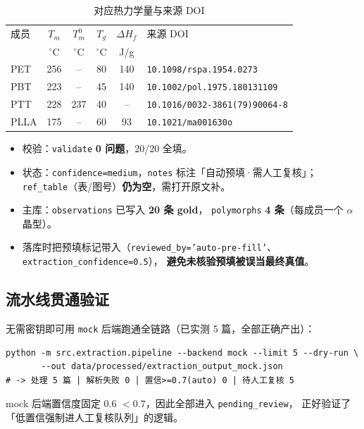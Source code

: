 \documentclass[11pt,a4paper]{ctexart}
\begin{document}
\begin{table}[htbp]
\centering
\caption{对应热力学量与来源 DOI}
\begin{tabular}{l c c c c l}
\toprule
成员 & $T_m$ & $T_m^0$ & $T_g$ & $\Delta H_f$ & 来源 DOI \\
     & $^\circ$C & $^\circ$C & $^\circ$C & J/g & \\
\midrule
PET  & 256 & --  & 80 & 140 & \texttt{10.1098/rspa.1954.0273} \\
PBT  & 223 & --  & 45 & 140 & \texttt{10.1002/pol.1975.180131109} \\
PTT  & 228 & 237 & 40 & --  & \texttt{10.1016/0032-3861(79)90064-8} \\
PLLA & 175 & --  & 60 & 93  & \texttt{10.1021/ma001630o} \\
\bottomrule
\end{tabular}
\end{table}

\begin{itemize}[leftmargin=1.2em]
  \item 校验：\texttt{validate} \textbf{0 问题}，20/20 全填。
  \item 状态：\texttt{confidence=medium}，\texttt{notes} 标注「自动预填·需人工复核」；
        \texttt{ref\_table}（表/图号）\textbf{仍为空}，需打开原文补。
  \item 主库：\texttt{observations} 已写入 \textbf{20 条 gold}，
        \texttt{polymorphs} \textbf{4 条}（每成员一个 $\alpha$ 晶型）。
  \item 落库时把预填标记带入（\texttt{reviewed\_by='auto-pre-fill'}、
        \texttt{extraction\_confidence=0.5}），
        \textbf{避免未核验预填被误当最终真值}。
\end{itemize}

\subsection{流水线贯通验证}
无需密钥即可用 \texttt{mock} 后端跑通全链路（已实测 5 篇，全部正确产出）：
\begin{lstlisting}[style=common]
python -m src.extraction.pipeline --backend mock --limit 5 --dry-run \
       --out data/processed/extraction_output_mock.json
# -> 处理 5 篇 | 解析失败 0 | 置信>=0.7(auto) 0 | 待人工复核 5
\end{lstlisting}
mock 后端置信度固定 0.6 $<0.7$，因此全部进入 \texttt{pending\_review}，
正好验证了「低置信强制进人工复核队列」的逻辑。
\end{document}
